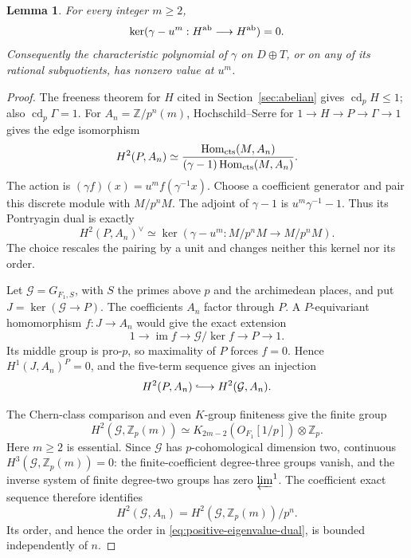\documentclass[11pt]{article}
\newtheorem{lemma}[theorem]{Lemma}
\theoremstyle{definition}\newtheorem{definition}[theorem]{Definition}
\begin{document}
\begin{lemma}\label{lem:positive-eigenvalues}
For every integer $m\geq2$,
\[
 \ker(\gamma-u^m:H^{\rm ab}\longrightarrow H^{\rm ab})=0.
\]
Consequently the characteristic polynomial of $\gamma$
on $D\oplus T$, or on any of its rational subquotients,
has nonzero value at $u^m$.
\end{lemma}
\begin{proof}
The freeness theorem for $H$ cited in Section~\ref{sec:abelian}
gives $\operatorname{cd}_pH\leq1$; also
$\operatorname{cd}_p\Gamma=1$.
For $A_n=\mathbb Z/p^n(m)$, Hochschild--Serre for
$1\to H\to P\to\Gamma\to1$ gives the edge isomorphism
\[
 H^2(P,A_n)\simeq
 \frac{\operatorname{Hom}_{\rm cts}(M,A_n)}
      {(\gamma-1)\operatorname{Hom}_{\rm cts}(M,A_n)}.
\]
The action is $(\gamma f)(x)=u^m f(\gamma^{-1}x)$.
Choose a coefficient generator and pair this discrete
module with $M/p^nM$. The adjoint of $\gamma-1$ is
$u^m\gamma^{-1}-1$. Thus its Pontryagin dual is exactly
\begin{equation}\label{eq:positive-eigenvalue-dual}
 H^2(P,A_n)^\vee\simeq
       \ker(\gamma-u^m:M/p^nM\longrightarrow M/p^nM).
\end{equation}
The choice rescales the pairing by a unit and changes
neither this kernel nor its order.

Let $\mathcal G=G_{F_1,S}$, with $S$ the primes above $p$
and the archimedean places, and put
$J=\ker(\mathcal G\to P)$. The coefficients $A_n$ factor
through $P$. A $P$-equivariant homomorphism $f:J\to A_n$
would give the exact extension
\[
 1\longrightarrow\operatorname{im}f\longrightarrow
       \mathcal G/\ker f\longrightarrow P\longrightarrow1.
\]
Its middle group is pro-$p$, so maximality of $P$ forces
$f=0$. Hence $H^1(J,A_n)^P=0$, and the five-term sequence
gives an injection
\[
                    H^2(P,A_n)\lhook\joinrel\longrightarrow
                         H^2(\mathcal G,A_n).
\]

The Chern-class comparison and even $K$-group finiteness
\cite[VI, Theorem~8.2, chapter p.~47]{Weibel} give the
finite group
\[
 H^2(\mathcal G,\mathbb Z_p(m))
     \simeq K_{2m-2}(O_{F_1}[1/p])\otimes\mathbb Z_p.
\]
Here $m\geq2$ is essential. Since $\mathcal G$ has
$p$-cohomological dimension two, continuous
$H^3(\mathcal G,\mathbb Z_p(m))=0$: the finite-coefficient
degree-three groups vanish, and the inverse system of
finite degree-two groups has zero $\varprojlim^1$.
The coefficient exact sequence therefore identifies
\[
 H^2(\mathcal G,A_n)
      =H^2(\mathcal G,\mathbb Z_p(m))/p^n.
\]
Its order, and hence the order in
\eqref{eq:positive-eigenvalue-dual}, is bounded independently of $n$.


\end{proof}
\end{document}
